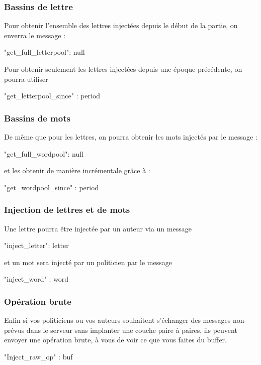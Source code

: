 \documentclass{article}
\begin{document}
\subsubsection{Bassins de lettre}
\label{sec:bassins-de-lettre}
Pour obtenir l'ensemble des lettres injectées depuis le début de la
partie, on enverra le message :
\begin{jsonMessage}
  { "get_full_letterpool": null}
\end{jsonMessage}
Pour obtenir seulement les lettres injectées depuis une époque
précédente, on pourra utiliser
\begin{jsonMessage}
  { "get_letterpool_since" : period }
\end{jsonMessage}
\subsubsection{Bassins de mots}
\label{sec:bassins-de-lettre}
De même que pour les lettres, on pourra obtenir les mots injectés par
le message :
\begin{jsonMessage}
  { "get_full_wordpool": null}
\end{jsonMessage}
et les obtenir de manière incrémentale grâce à :
\begin{jsonMessage}
  { "get_wordpool_since" : period}
\end{jsonMessage}
\subsubsection{Injection de lettres et de mots}
\label{sec:injection}
Une lettre pourra être injectée par un auteur via un message
\begin{jsonMessage}
  { "inject_letter": letter }
\end{jsonMessage}
et un mot sera injecté par un politicien par le message
\begin{jsonMessage}
  { "inject_word" : word }
\end{jsonMessage}

\subsubsection{Opération brute}
\label{sec:operation-brute}

Enfin si vos politiciens ou vos auteurs souhaitent s'échanger des
messages non-prévus dans le serveur sans implanter une couche paire à
paires, ils peuvent envoyer une opération brute, à vous de voir ce que
vous faites du buffer.
\begin{jsonMessage}
  { "Inject_raw_op" : buf }
\end{jsonMessage}
\end{document}
